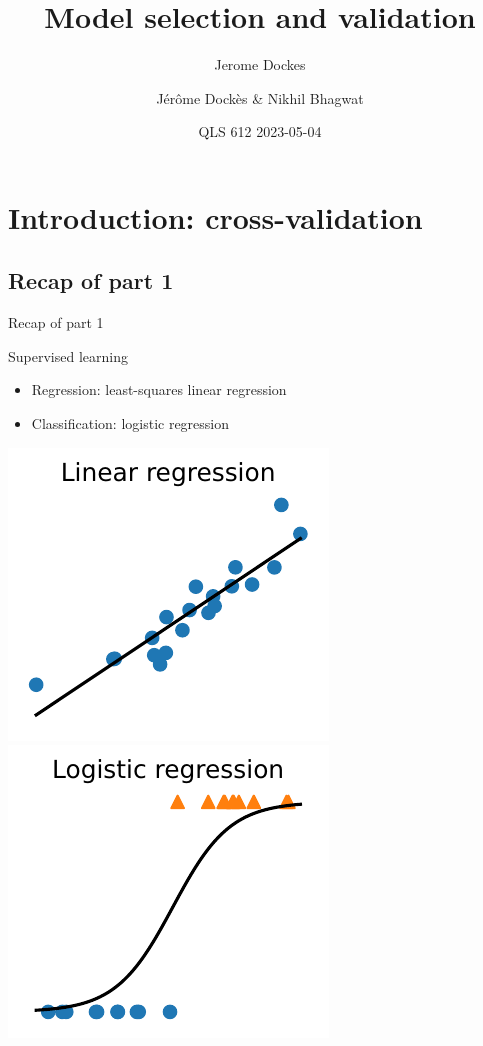 \documentclass[presentation,mathserif,table]{beamer}
\author{Jerome Dockes}
\date{}
\title{Model selection and validation}
\author{Jérôme Dockès \& Nikhil Bhagwat}
\date{QLS 612 2023-05-04}
\begin{document}
\maketitle
\section{Introduction: cross-validation}
\label{sec:orgc94a597}
\subsection{Recap of part 1}
\label{sec:orga17948d}
\begin{frame}[label={sec:org1fa32ec}]{Recap of part 1}
\begin{block}{Supervised learning}
\begin{itemize}
\item Regression: least-squares linear regression
\item Classification: logistic regression
\end{itemize}
\includegraphics[height=.4 \textheight]{figures/generated/linear_regression_1d/linear_regression.pdf}
\includegraphics[height=.4 \textheight]{figures/generated/logistic_regression_1d/logistic_regression.pdf}
\end{block}
\end{frame}
\end{document}
